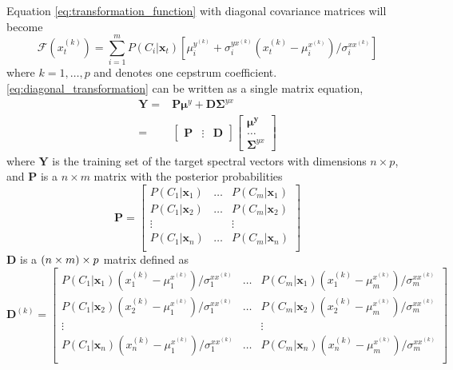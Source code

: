 Equation \eqref{eq:transformation_function} with diagonal covariance matrices will become
\begin{equation}
	\label{eq:diagonal_transformation}
	\mathcal{F}(x_t^{(k)}) = \sum_{i=1}^{m} P(C_i\vert \mathbf{x}_t) [\mu_i^{y^{(k)}}+\sigma_i^{yx^{(k)}}  (x_t^{(k)}-\mu_i^{x^{(k)}})/\sigma_i^{xx^{(k)}}]
\end{equation}
where $k=1,\dots,p$ and denotes one cepstrum coefficient. \eqref{eq:diagonal_transformation} can be written as a single matrix equation,
\begin{equation}
	\label{eq:least_square_problem}
	\begin{split}
		\mathbf{Y} = &\mathbf{P}\boldsymbol{\mu}^y + \mathbf{D}\mathbf{\Sigma}^{yx} \\
		= & \begin{bmatrix}
			\mathbf{P}& \vdots &\mathbf{D}
		\end{bmatrix}
		\begin{bmatrix}
			\boldsymbol{\mu^y} \\
			\dots \\
			\mathbf{\Sigma}^{yx}
		\end{bmatrix}
	\end{split}
\end{equation}
where $\mathbf{Y}$ is the training set of the target spectral vectors with dimensions $n\times p$, and $\mathbf{P}$ is a $n \times m$ matrix with the posterior probabilities
\begin{equation}
	\label{eq:P_matrix}
	\mathbf{P} = \begin{bmatrix}
		P(C_1\vert \mathbf{x}_1) & \dots & P(C_m\vert \mathbf{x}_1) \\
		P(C_1\vert \mathbf{x}_2) & \dots & P(C_m\vert \mathbf{x}_2) \\
		\vdots & & \vdots \\
		P(C_1\vert \mathbf{x}_n) & \dots & P(C_m\vert \mathbf{x}_n) \\
	\end{bmatrix}
\end{equation}
$\mathbf{D}$ is a $\left(n \times m\right)\times p$ matrix defined as
\begin{equation}
	\label{eq:D_matrix_new}
	\mathbf{D}^{(k)} = \begin{bmatrix}
		P(C_1\vert \mathbf{x}_1) (x_1^{(k)} - \mu_1^{x^{(k)}})/\sigma_1^{xx^{(k)}} & \dots & P(C_m\vert \mathbf{x}_1) (x_1^{(k)} - \mu_m^{x^{(k)}})/\sigma_m^{xx^{(k)}} \\
		P(C_1\vert \mathbf{x}_2) (x_2^{(k)} - \mu_1^{x^{(k)}})/\sigma_1^{xx^{(k)}} & \dots & P(C_m\vert \mathbf{x}_2) (x_2^{(k)} - \mu_m^{x^{(k)}})/\sigma_m^{xx^{(k)}} \\
		\vdots & & \vdots \\
		P(C_1\vert \mathbf{x}_n) (x_n^{(k)} - \mu_1^{x^{(k)}})/\sigma_1^{xx^{(k)}} & \dots & P(C_m\vert \mathbf{x}_n) (x_n^{(k)} - \mu_m^{x^{(k)}})/\sigma_m^{xx^{(k)}} \\
	\end{bmatrix}
\end{equation}

